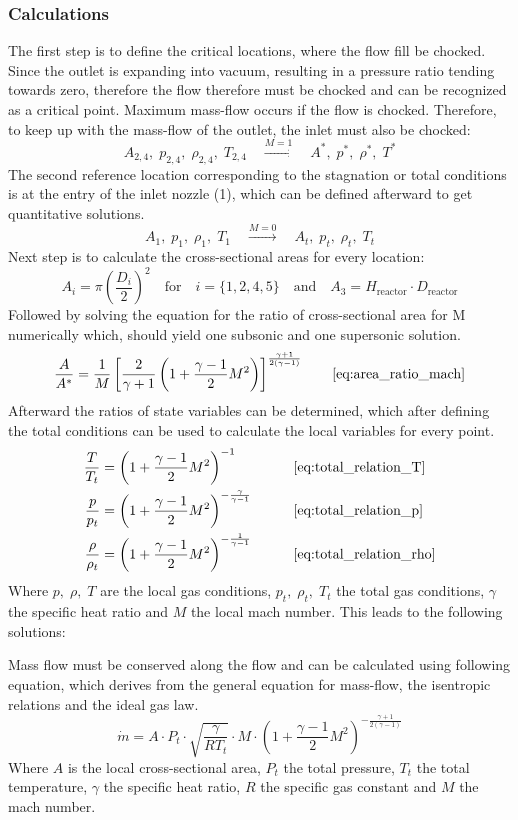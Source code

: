 \subsubsection*{Calculations}
The first step is to define the critical locations, where the flow fill be chocked.
Since the outlet is expanding into vacuum, resulting in a pressure ratio tending towards zero, therefore the flow therefore must be chocked and can be recognized as a critical point.
Maximum mass-flow occurs if the flow is chocked. Therefore, to keep up with the mass-flow of the outlet, the inlet must also be chocked: 
$$
	A_{2,4},\;p_{2,4},\;\rho_{2,4},\;T_{2,4}\quad\xrightarrow{M=1}\quad A^*,\;p^*,\;\rho^*,\;T^*
$$
The second reference location corresponding to the stagnation or total conditions is at the entry of the inlet nozzle (1), which can be defined afterward to get quantitative solutions.
$$
	A_1,\;p_1,\;\rho_1,\;T_1\quad\xrightarrow{M=0}\quad A_t,\;p_t,\;\rho_t,\;T_t
$$
Next step is to calculate the cross-sectional areas for every location:
$$
	A_i = \pi \left(\frac{D_i}{2}\right)^2
		\quad \text{for} \quad
	i=\{1,2,4,5\}
		\quad \text{and} \quad
	A_3 = H_\text{reactor}\cdot D_\text{reactor}
$$
Followed by solving the equation for the ratio of cross-sectional area for M numerically which, should yield one subsonic and one supersonic solution.
$$
	\frac{A}{A^*} = \frac{1}{M} \left[ \frac{2}{\gamma + 1} \left( 1 + \frac{\gamma - 1}{2} M^2 \right) \right]^{\frac{\gamma + 1}{2(\gamma - 1)}}
	\qquad \eqref{eq:area_ratio_mach}
$$
Afterward the ratios of state variables can be determined, which after defining the total conditions can be used to calculate the local variables for every point.
\cite{hall_isentropic_nodate}
\begin{alignat*}{2}
    \frac{T}{T_t}   & = \left( 1 + \frac{\gamma - 1}{2} M^2 \right)^{-1}
    & \qquad & \eqref{eq:total_relation_T} \\
    \frac{p}{p_t}   & = \left( 1 + \frac{\gamma - 1}{2} M^2 \right)^{-\frac{\gamma}{\gamma - 1}}
    & \qquad & \eqref{eq:total_relation_p} \\
    \frac{\rho}{\rho_t} & = \left( 1 + \frac{\gamma - 1}{2} M^2 \right)^{-\frac{1}{\gamma - 1}}
    & \qquad & \eqref{eq:total_relation_rho}
\end{alignat*}
Where $p,\; \rho,\; T$ are the local gas conditions, $p_t,\; \rho_t,\; T_t$ the total gas conditions, $\gamma$ the specific heat ratio and $M$ the local mach number.
This leads to the following solutions:

Mass flow must be conserved along the flow and can be calculated using following equation, which derives from the general equation for mass-flow, the isentropic relations and the ideal gas law.
\cite{benson_mass_nodate}
$$
	\dot{m} = A \cdot P_t \cdot \sqrt{\frac{\gamma}{R T_t}} \cdot M \cdot \left(1 + \frac{\gamma - 1}{2} M^2\right)^{-\frac{\gamma + 1}{2(\gamma - 1)}}
$$
Where $A$ is the local cross-sectional area, $P_t$ the total pressure, $T_t$ the total temperature, $\gamma$ the specific heat ratio, $R$ the specific gas constant and $M$ the mach number.
\cite{Cantwell_AA210A}
